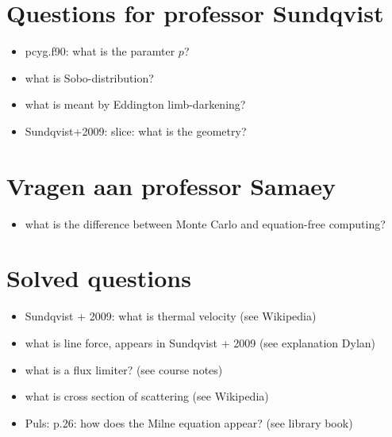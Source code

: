 \documentclass[../main/main.tex]{subfiles}
\begin{document}
\section{Questions for professor Sundqvist}
\begin{itemize}
\item pcyg.f90: what is the paramter $p$?
\item what is Sobo-distribution?
\item what is meant by Eddington limb-darkening?
\item Sundqvist+2009: slice: what is the geometry?
\end{itemize}

\newpage
\section{Vragen aan professor Samaey}
\begin{itemize}
\item what is the difference between Monte Carlo and equation-free computing?
\end{itemize}

\section{Solved questions}
\begin{itemize}
\item Sundqvist + 2009: what is thermal velocity (see Wikipedia)
\item what is line force, appears in Sundqvist + 2009 (see explanation Dylan)
\item what is a flux limiter? (see course notes)
\item what is cross section of scattering (see Wikipedia)
\item Puls: p.26: how does the Milne equation appear? (see library book)
\end{itemize}
\end{document}
